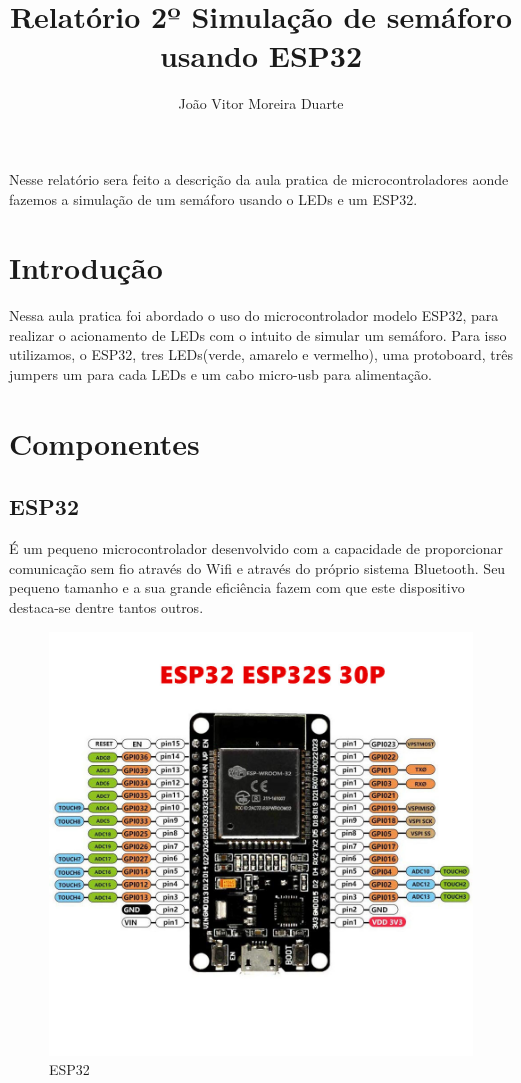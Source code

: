 \documentclass[12pt]{article}
\title{Relatório 2º Simulação de semáforo usando ESP32}
\author{João Vitor Moreira Duarte }
\begin{document}
\maketitle
\begin{resumo}
  Nesse relatório sera feito a descrição da aula pratica de microcontroladores aonde fazemos a simulação de um semáforo usando o LEDs e um ESP32.
\end{resumo}


\section{Introdução}
Nessa aula pratica foi abordado o uso do microcontrolador modelo ESP32, para realizar o acionamento de LEDs
com o intuito de simular um semáforo. Para isso utilizamos, o ESP32, tres LEDs(verde, amarelo e vermelho),
uma protoboard, três jumpers um para cada LEDs e um cabo micro-usb para alimentação.

\section{Componentes} \label{sec:firstpage}

\subsection{ESP32}
É um pequeno microcontrolador desenvolvido com a capacidade de proporcionar comunicação sem fio através do Wifi
e através do próprio sistema Bluetooth. Seu pequeno tamanho e a sua grande eficiência fazem com que este dispositivo
destaca-se dentre tantos outros.

\begin{figure}[ht]
  \centering
  \includegraphics[width=.5\textwidth]{Images/ESP32.jpg}
  \caption{ESP32}
  \label{fig:exampleESP32}
\end{figure}
\end{document}
